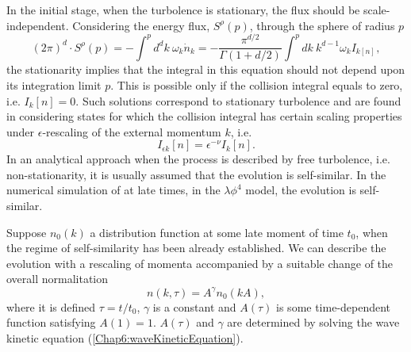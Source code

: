\documentclass[11pt,a4paper,twoside]{book}
\begin{document}
In the initial stage, when the turbolence is stationary, the flux should be scale-independent. Considering the energy flux, $ S^{\rho}(p) $, through the sphere of radius $ p $
\begin{equation}
\label{Chap6:energyFluxRaidus}
(2\pi)^{d} \cdot S^{\rho}(p)=-\int^{p} d^{d}k\  \omega_{k} \dot{n}_{k}=-\frac{\pi^{d/2}}{\Gamma(1+d/2)}\int^{p}dk\ k^{d-1}\omega_{k}I_{k[n]_{}},
\end{equation}
the stationarity implies that the  integral in this equation should not depend upon its integration limit $ p $. This is possible only if the collision integral equals to zero, i.e. $ I_{k}[n]=0 $. Such solutions correspond to stationary turbolence and are found in \cite{Chap6:TurbolentThermalization} considering states for which the collision integral has certain scaling properties under $\epsilon$-rescaling of the external momentum $ k $, i.e. 
\begin{equation}
\label{Chap6:rescalingCollisionIntegral}
I_{\epsilon k}[n]=\epsilon^{-\nu}I_{k}[n].
\end{equation}
In an analytical approach when the process is described by free turbolence, i.e. non-stationarity, it is usually assumed that the evolution is self-similar. In the numerical simulation of \cite{Chap6:TurbolentThermalization} at late times, in the $ \lambda \phi^{4} $ model, the evolution is self-similar.

Suppose $ n_{0}(k) $ a distribution function at some late moment of time $ t_{0} $, when the regime of self-similarity has been already established. We can describe the evolution with a rescaling of momenta accompanied by a suitable change of the overall normalitation
\begin{equation}
\label{Chap6:evolutionSelfSimilarGeneral}
n(k,\tau)=A^{\gamma}n_{0}(kA),
\end{equation} 
where it is defined $ \tau=t/t_{0} $, $\gamma$ is a constant and $ A(\tau) $ is some time-dependent function satisfying $ A(1)=1 $. $ A(\tau) $ and $\gamma$ are determined by solving the wave kinetic equation (\ref{Chap6:waveKineticEquation}).
\end{document}

